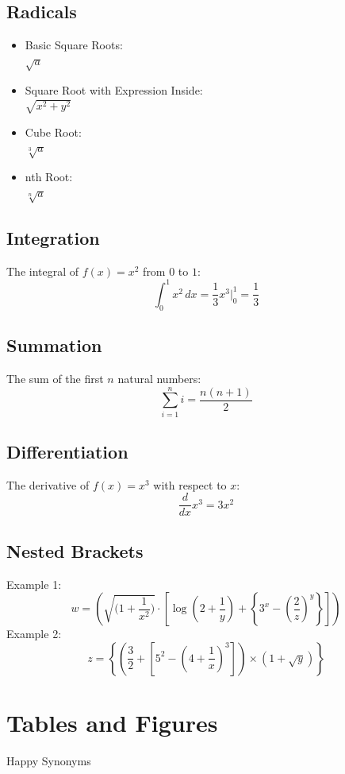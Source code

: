 \documentclass[12pt,a4paper]{article}
\begin{document}
	\pagebreak
	
	\subsection{Radicals}
	\begin{itemize}
		\item Basic Square Roots:\\
		\(\sqrt{a}\)
		\item Square Root with Expression Inside:\\ \(\sqrt{x^2 + y^2}\)
		\item Cube Root:\\
		\(\sqrt[3]{a}\)
		\item nth Root:\\
		\(\sqrt[n]{a}\)
	\end{itemize}
	
	\subsection{Integration}
	The integral of $f(x) = x^2$ from $0$ to $1$:
	\[
	\int_{0}^{1} x^2 \,dx = \frac{1}{3}x^3 \Big|_0^1 = \frac{1}{3}
	\]
	
	\subsection{Summation}
	The sum of the first $n$ natural numbers:
	\[
	\sum_{i=1}^n i = \frac{n(n+1)}{2}
	\]
	\newpage
	\subsection{Differentiation}
	The derivative of $f(x) = x^3$ with respect to $x$:
	\[
	\frac{d}{dx}x^3 = 3x^2
	\]
	
	\subsection{Nested Brackets}
	Example 1:
	\[
	w = \left( \sqrt{\Big(1 + \frac{1}{x^2}\Big)} \cdot \left[ \log \left( 2 + \frac{1}{y} \right) + \left\{ 3^x - \left( \frac{2}{z} \right)^y \right\} \right]\right)
	\]
	Example 2:
	\[
	z = \left\{ \left( \frac{3}{2} + \left[ 5^2 - \left( 4 + \frac{1}{x} \right)^3 \right] \right) \times \left( 1 + \sqrt{y} \right) \right\}
	\]
	

	
	\pagebreak
	
	\section{Tables and Figures}
	Happy Synonyms
	
\end{document}
